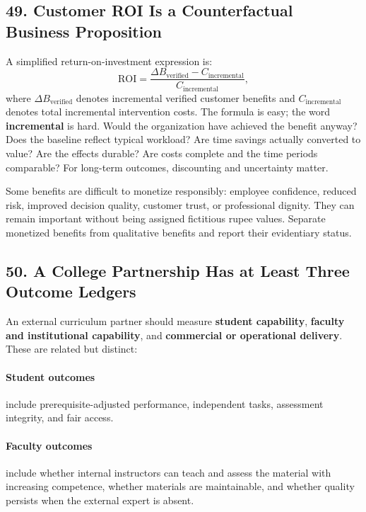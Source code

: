 \subsection*{49. Customer ROI Is a Counterfactual Business Proposition}

A simplified return-on-investment expression is:
\begin{equation}
\mathrm{ROI} = \frac{\Delta B_{\text{verified}} - C_{\text{incremental}}}{C_{\text{incremental}}},
\end{equation}
where $\Delta B_{\text{verified}}$ denotes incremental verified customer benefits and $C_{\text{incremental}}$ denotes total incremental intervention costs. The formula is easy; the word \textbf{incremental} is hard. Would the organization have achieved the benefit anyway? Does the baseline reflect typical workload? Are time savings actually converted to value? Are the effects durable? Are costs complete and the time periods comparable? For long-term outcomes, discounting and uncertainty matter.

Some benefits are difficult to monetize responsibly: employee confidence, reduced risk, improved decision quality, customer trust, or professional dignity. They can remain important without being assigned fictitious rupee values. Separate monetized benefits from qualitative benefits and report their evidentiary status.

\subsection*{50. A College Partnership Has at Least Three Outcome Ledgers}

An external curriculum partner should measure \textbf{student capability}, \textbf{faculty and institutional capability}, and \textbf{commercial or operational delivery}. These are related but distinct:

\paragraph*{Student outcomes} include prerequisite-adjusted performance, independent tasks, assessment integrity, and fair access.

\paragraph*{Faculty outcomes} include whether internal instructors can teach and assess the material with increasing competence, whether materials are maintainable, and whether quality persists when the external expert is absent.

